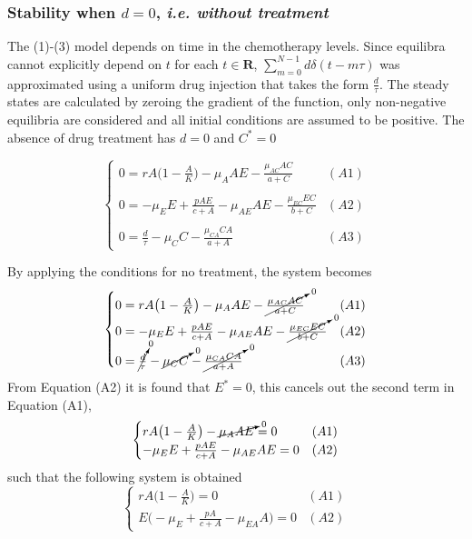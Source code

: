 \subsubsection{Stability when $d=0$, \textit{i.e. without treatment}}
The (1)-(3) model depends on time in the chemotherapy levels. Since equilibra cannot explicitly depend on $t$ for each $t\in \mathbf{R}$, $\sum_{m=0}^{N-1} d\delta(t - m\tau)$ was approximated using a uniform drug injection that takes the form $\frac{d}{\tau}$. 
The steady states are calculated by zeroing the gradient of the function, only non-negative equilibria are considered and all initial conditions are assumed to be positive.
The absence of drug treatment has $d=0$ and $C^*=0$

\[
	\begin{cases}
	0 = rA \bigl( 1 - \frac{A}{K} \bigr) - \mu_A AE - \frac{\mu_{AC} AC}{a+C} & (A1)\\ \\ 
	0 = -\mu_E E + \frac{pAE}{c+A} - \mu_{AE} AE - \frac{\mu_{EC} EC}{b+C} & (A2) \\ \\
	0 = \frac{d}{\tau} - \mu_CC - \frac{\mu_{CA} CA}{a+A} & (A3) 
	\end{cases} 
\]

By applying the conditions for no treatment, the system becomes
\[
	\begin{cases}
		0 = rA \bigl( 1 - \frac{A}{K} \bigr) - \mu_A AE - \cancelto{0}{\frac{\mu_{AC} AC}{a+C}} & (A1)\\  
		0 = -\mu_E E + \frac{pAE}{c+A} - \mu_{AE} AE - \cancelto{0}{\frac{\mu_{EC} EC}{b+C}} & (A2) \\ 
		0 = \cancelto{0}{\frac{d}{\tau}} - \cancelto{0}{\mu_CC} - \cancelto{0}{\frac{\mu_{CA} CA}{a+A}} & (A3) 
	\end{cases} 
\]
From Equation (A2) it is found that $E^*=0$, this cancels out the second term in Equation (A1),
\[
	\begin{cases}
		rA \bigl( 1 - \frac{A}{K} \bigr) - \cancelto{0}{\mu_A AE} = 0 & (A1)\\ 
		-\mu_E E + \frac{pAE}{c+A} - \mu_{AE} AE  = 0 & (A2) 
	\end{cases} 
\]
such that the following system is obtained
\[ 
	\begin{cases}
		rA \bigl( 1 - \frac{A}{K} \bigr) = 0 & (A1) \\
		E \bigl( -\mu_E + \frac{pA}{c+A} - \mu_{EA}A \bigr) = 0 & (A2) 
	\end{cases}
\]

